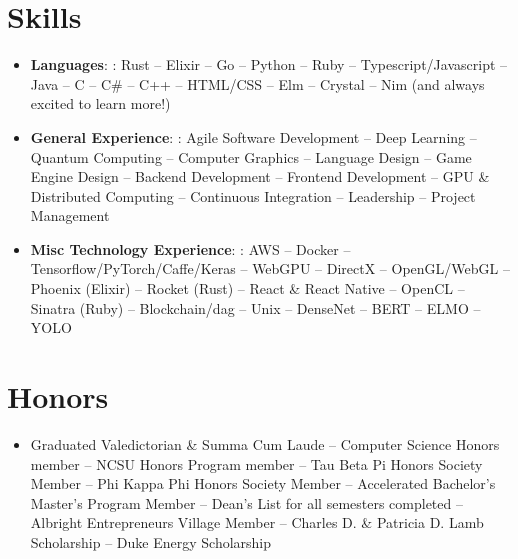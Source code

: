 \documentclass[letterpaper,10pt]{article}
\newcommand{\resumeItem}[2]{
  \item\small{
    \textbf{#1}{: #2 \vspace{-2pt}}
  }
}
\newcommand{\resumeSubItem}[2]{\resumeItem{#1}{#2}\vspace{-4pt}}
\newcommand{\resumeSubHeadingListStart}{\begin{itemize}[leftmargin=*]}
\newcommand{\resumeSubHeadingListEnd}{\end{itemize}}
\begin{document}
\section{Skills}
\resumeSubHeadingListStart
\resumeSubItem{Languages}
{: Rust -- Elixir -- Go -- Python -- Ruby -- Typescript/Javascript -- Java -- C -- C\# -- C++ -- HTML/CSS -- Elm -- Crystal -- Nim (and always excited to learn more!)}
\resumeSubItem{General Experience}{: Agile Software Development -- Deep Learning -- Quantum Computing -- Computer Graphics -- Language Design -- Game Engine Design -- Backend Development -- Frontend Development -- GPU \& Distributed Computing -- Continuous Integration -- Leadership -- Project Management}
\resumeSubItem{Misc Technology Experience}{: AWS -- Docker -- Tensorflow/PyTorch/Caffe/Keras -- WebGPU -- DirectX -- OpenGL/WebGL -- Phoenix (Elixir) -- Rocket (Rust) -- React \& React Native -- OpenCL -- Sinatra (Ruby) -- Blockchain/dag -- Unix -- DenseNet -- BERT -- ELMO -- YOLO}
\resumeSubHeadingListEnd


\section{Honors}
\resumeSubHeadingListStart
\item\small{Graduated Valedictorian \& Summa Cum Laude -- Computer Science Honors member -- NCSU Honors Program member -- Tau Beta Pi Honors Society Member -- Phi Kappa Phi Honors Society Member -- Accelerated Bachelor's Master's Program Member -- Dean’s List for all semesters completed -- Albright Entrepreneurs Village Member -- Charles D. \& Patricia D. Lamb Scholarship -- Duke Energy Scholarship
  \vspace{-2pt}
}
\resumeSubHeadingListEnd

\end{document}
